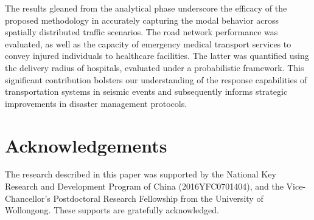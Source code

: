 \documentclass[review,11pt,nonatbib]{elsarticle}
\begin{document}
The results gleaned from the analytical phase underscore the efficacy of the proposed methodology in accurately capturing the modal behavior across spatially distributed traffic scenarios. The road network performance was evaluated, as well as the capacity of emergency medical transport services to convey injured individuals to healthcare facilities. The latter was quantified using the delivery radius of hospitals, evaluated under a probabilistic framework. This significant contribution bolsters our understanding of the response capabilities of transportation systems in seismic events and subsequently informs strategic improvements in disaster management protocols.

\section*{Acknowledgements}
The research described in this paper was supported by the National Key Research and Development Program of China (2016YFC0701404), and the Vice-Chancellor's Postdoctoral Research Fellowship from the University of Wollongong. These supports are gratefully acknowledged.

\printbibliography
\end{document}
